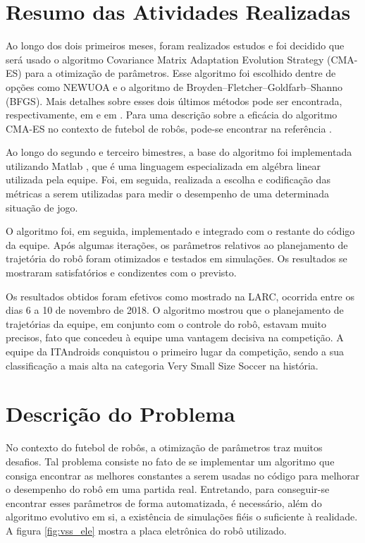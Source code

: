 \documentclass[a4paper,12pt]{article}
\begin{document}
\section{Resumo das Atividades Realizadas}
\label{secao:atividades_realizadas}

Ao longo dos dois primeiros meses, foram realizados estudos e foi decidido que será usado o algoritmo Covariance Matrix Adaptation Evolution Strategy (CMA-ES) para a otimização de parâmetros. Esse algoritmo foi escolhido dentre de opções como NEWUOA e o algoritmo de Broyden–Fletcher–Goldfarb–Shanno (BFGS). Mais detalhes sobre esses dois últimos métodos pode ser encontrada, respectivamente, em \cite{NEWUOA} e em \cite{BFGS}. Para uma descrição sobre a eficácia do algoritmo CMA-ES no contexto de futebol de robôs, pode-se encontrar na referência \cite{CMA-ES}.

Ao longo do segundo e terceiro bimestres, a base do algoritmo foi implementada utilizando Matlab \cite{matlab}, que é uma linguagem especializada em algébra linear utilizada pela equipe. Foi, em seguida, realizada a escolha e codificação das métricas a serem utilizadas para medir o desempenho de uma determinada situação de jogo.

O algoritmo foi, em seguida, implementado e integrado com o restante do código da equipe. Após algumas iterações, os parâmetros relativos ao planejamento de trajetória do robô foram otimizados e testados em simulações. Os resultados se mostraram satisfatórios e condizentes com o previsto.

Os resultados obtidos foram efetivos como mostrado na LARC, ocorrida entre os dias 6 a 10 de novembro de 2018. O algoritmo mostrou que o planejamento de trajetórias da equipe, em conjunto com o controle do robô, estavam muito precisos, fato que concedeu à equipe uma vantagem decisiva na competição. A equipe da ITAndroids conquistou o primeiro lugar da competição, sendo a sua classificação a mais alta  na categoria Very Small Size Soccer na história.

\section{Descrição do Problema}
\label{secao:enunciado_problema}

No contexto do futebol de robôs, a otimização de parâmetros traz muitos desafios. Tal problema consiste no fato de se implementar um algoritmo que consiga encontrar as melhores constantes a serem usadas no código para melhorar o desempenho do robô em uma partida real. Entretando, para conseguir-se encontrar esses parâmetros de forma automatizada, é necessário, além do algoritmo evolutivo em si, a existência de simulações fiéis o suficiente à realidade. A figura \ref{fig:vss_ele} mostra a placa eletrônica do robô utilizado.
\end{document}
